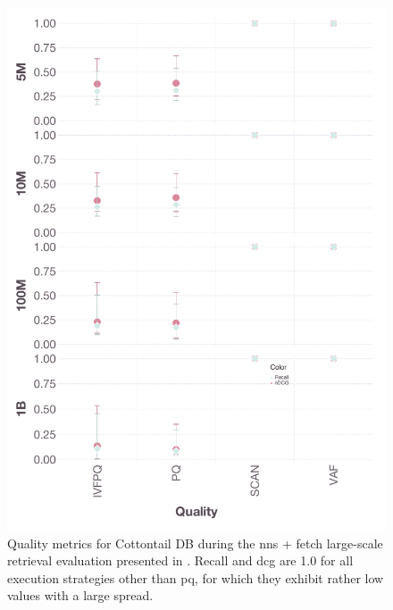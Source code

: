 \begin{figure}[p]
    \includegraphics[width=\linewidth]{figures/bignns-cottontail-quality-NNS + Fetch}
    \caption{Quality metrics for Cottontail DB during the \acrshort{nns} + fetch large-scale retrieval evaluation presented in . Recall and \acrshort{dcg} are 1.0 for all execution strategies other than \acrshort{pq}, for which they exhibit rather low values with a large spread.}
    \label{figure:appendix_bignns_cottontail_nns_fetch_quality}
\end{figure}


